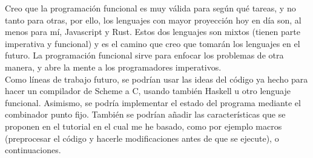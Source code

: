 Creo que la programaci\'on funcional es muy v\'alida para seg\'un qu\'e tareas, y no tanto para otras, por ello, los lenguajes con mayor proyecci\'on hoy en d\'ia son, al menos para m\'i, Javascript y Rust. Estos dos lenguajes son mixtos (tienen parte imperativa y funcional) y es el camino que creo que tomar\'an los lenguajes en el futuro. La programaci\'on funcional sirve para enfocar los problemas de otra manera, y abre la mente a los programadores imperativos.\\

Como l\'ineas de trabajo futuro, se podr\'ian usar las ideas del c\'odigo ya hecho para hacer un compilador de Scheme a C, usando tambi\'en Haskell u otro lenguaje funcional. Asimismo, se podr\'ia implementar el estado del programa mediante el combinador punto fijo. Tambi\'en se podr\'ian a\~{n}adir las caracter\'isticas que se proponen en el tutorial en el cual me he basado, como por ejemplo macros (preprocesar el c\'odigo y hacerle modificaciones antes de que se ejecute), o continuaciones.